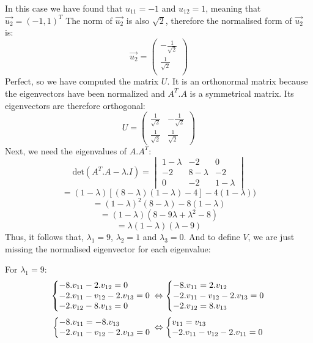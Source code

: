 \documentclass[600paper, 11pt,twoside,openany]{kdp}
\begin{document}
\indent In this case we have found that $u_{11} = -1$ and $u_{12} = 1$, meaning that $\overrightarrow{u_2} = (-1,1)^T$
The norm of $\overrightarrow{u_2}$ is also $\sqrt{2}$, therefore the normalised form of $\overrightarrow{u_2}$ is:
\[
\overrightarrow{u_2} = \begin{pmatrix}
-\frac{1}{\sqrt{2}}\\
\frac{1}{\sqrt{2}}\\
\end{pmatrix}
\]
\indent Perfect, so we have computed the matrix $U$. It is an orthonormal matrix because the eigenvectors have been normalized and $A^T.A$ is a symmetrical matrix. Its eigenvectors are therefore orthogonal:
\[
U = \begin{pmatrix}
\frac{1}{\sqrt{2}} & -\frac{1}{\sqrt{2}} \\
\frac{1}{\sqrt{2}} & \frac{1}{\sqrt{2}}
\end{pmatrix}
\]
\indent Next, we need the eigenvalues of $A.A^T$:
\[
\textrm{det}(A^T.A - \lambda.I) = \begin{vmatrix} 
1-\lambda & -2 & 0 \\
-2 & 8-\lambda & -2 \\
0 & -2 & 1-\lambda
\end{vmatrix}
\]
\[=(1-\lambda)\left[(8-\lambda)(1-\lambda)-4 \right]-4(1-\lambda) )\]
\[=(1-\lambda)^2(8-\lambda)-8(1-\lambda)\]
\[=(1-\lambda)(8-9\lambda + \lambda^2 -8)\]
\[=\lambda(1-\lambda)(\lambda-9)\]
\indent Thus, it follows that, $\lambda_1 = 9$, $\lambda_2 = 1$ and $\lambda_3 = 0$. And to define $V$, we are just missing the normalised eigenvector for each eigenvalue:
\par
\indent For $\lambda_1 = 9$:
\[
  \left\{\begin{array}{@{}l@{}}
   -8.v_{11} -2.v_{12} = 0\\
   -2.v_{11} -v_{12}-2.v_{13} = 0\\
   -2.v_{12}- 8.v_{13} = 0\\
  \end{array}\right.\,
   \Leftrightarrow
  \left\{\begin{array}{@{}l@{}}
  -8.v_{11} = 2.v_{12}\\
  -2.v_{11} -v_{12}-2.v_{13} = 0\\
  -2.v_{12} = 8.v_{13}\\
  \end{array}\right.\,
\]
\[
  \left\{\begin{array}{@{}l@{}}
   -8.v_{11} = -8.v_{13}\\
   -2.v_{11} -v_{12}-2.v_{13} = 0\\
  \end{array}\right.\,
   \Leftrightarrow
  \left\{\begin{array}{@{}l@{}}
   v_{11} = v_{13}\\
  -2.v_{11} -v_{12}-2.v_{11} = 0\\
  \end{array}\right.\,
\]
\end{document}
